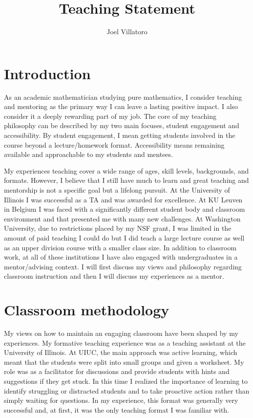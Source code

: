 \documentclass{article}
\title{Teaching Statement}
\author{Joel Villatoro}
\date{}
\begin{document}
\vspace{-0.5in}
\maketitle

\section*{Introduction}
As an academic mathematician studying pure mathematics, I consider teaching and mentoring as the primary way I can leave a lasting positive impact. 
I also consider it a deeply rewarding part of my job.
The core of my teaching philosophy can be described by my two main focuses, student engagement and accessibility. 
By student engagement, I mean getting students involved in the course beyond a lecture/homework format. Accessibility means remaining available and approachable to my students and mentees.

My experiences teaching cover a wide range of ages, skill levels, backgrounds, and formats. However, I believe that I still have much to learn and great teaching and mentorship is not a specific goal but a lifelong pursuit. At the University of Illinois I was successful as a TA and was awarded for excellence. At KU Leuven in Belgium I was faced with a significantly different student body and classroom environment and that presented me with many new challenges. At Washington University, due to restrictions placed by my NSF grant, I was limited in the amount of paid teaching I could do but I did teach a large lecture course as well as an upper division course with a smaller class size. In addition to classroom work, at all of these institutions I have also engaged with undergraduates in a mentor/advising context. I will first discuss my views and philosophy regarding classroom instruction and then I will discuss my experiences as a mentor.

\section*{Classroom methodology}


My views on how to maintain an engaging classroom have been shaped by my experiences. My formative teaching experience was as a teaching assistant at the University of Illinois. At UIUC, the main approach was active learning, which meant that the students were split into small groups and given a worksheet. My role was as a facilitator for discussions and provide students with hints and suggestions if they get stuck. In this time I realized the importance of learning to identify struggling or distracted students and to take proactive action rather than simply waiting for questions. In my experience, this format was generally very successful and, at first, it was the only teaching format I was familiar with.
\end{document}
